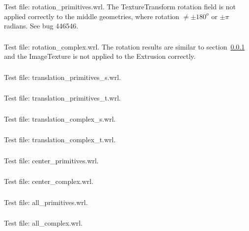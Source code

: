 \subsubsection{\TTGa\TTGb}
\label{sec:rotation}
Test file: rotation\_primitives.wrl.\newline
The TextureTransform rotation field is not applied correctly
to the middle geometries, where rotation $\neq \pm 180^o$ or
$\pm \pi$ radians.
See bug 446546.

\subsubsection{\TTHa\TTHb}
Test file: rotation\_complex.wrl.\newline
The rotation results are similar to section~\ref{sec:rotation} and
the ImageTexture is not applied to the Extrusion correctly.

\subsubsection{\TTIa\TTIb}
\label{sec:translation}
Test file: translation\_primitives\_s.wrl.\newline

\subsubsection{\TTJa\TTJb}
Test file: translation\_primitives\_t.wrl.\newline

\subsubsection{\TTKa\TTKb}
Test file: translation\_complex\_s.wrl.\newline

\subsubsection{\TTLa\TTLb}
Test file: translation\_complex\_t.wrl.\newline

\subsubsection{\TTMa\TTMb}
Test file: center\_primitives.wrl.\newline

\subsubsection{\TTNa\TTNb}
Test file: center\_complex.wrl.\newline

\subsubsection{\TTOa\TTOb}
Test file: all\_primitives.wrl.\newline

\subsubsection{\TTPa\TTPb}
Test file: all\_complex.wrl.\newline
